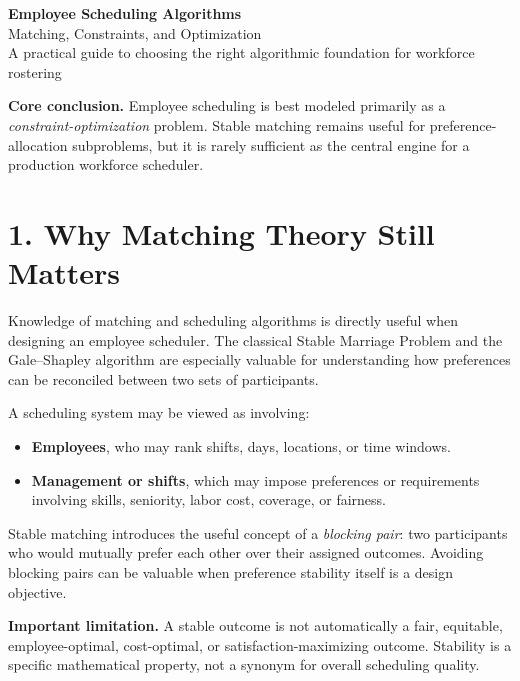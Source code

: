 \documentclass[11pt]{article}
\begin{document}
\begin{center}
  {\LARGE\bfseries\color{Navy} Employee Scheduling Algorithms}\\[0.35em]
  {\large Matching, Constraints, and Optimization}\\[0.6em]
  {\small A practical guide to choosing the right algorithmic foundation for workforce rostering}
\end{center}

\vspace{0.4em}

\begin{keybox}
\textbf{Core conclusion.}
Employee scheduling is best modeled primarily as a \emph{constraint-optimization} problem.
Stable matching remains useful for preference-allocation subproblems, but it is rarely sufficient as the central engine for a production workforce scheduler.
\end{keybox}

\section{1. Why Matching Theory Still Matters}

Knowledge of matching and scheduling algorithms is directly useful when designing an employee scheduler.
The classical Stable Marriage Problem and the Gale--Shapley algorithm are especially valuable for understanding how preferences can be reconciled between two sets of participants.

A scheduling system may be viewed as involving:

\begin{itemize}
  \item \textbf{Employees}, who may rank shifts, days, locations, or time windows.
  \item \textbf{Management or shifts}, which may impose preferences or requirements involving skills, seniority, labor cost, coverage, or fairness.
\end{itemize}

Stable matching introduces the useful concept of a \emph{blocking pair}: two participants who would mutually prefer each other over their assigned outcomes. Avoiding blocking pairs can be valuable when preference stability itself is a design objective.

\begin{cautionbox}
\textbf{Important limitation.}
A stable outcome is not automatically a fair, equitable, employee-optimal, cost-optimal, or satisfaction-maximizing outcome.
Stability is a specific mathematical property, not a synonym for overall scheduling quality.
\end{cautionbox}
\end{document}
